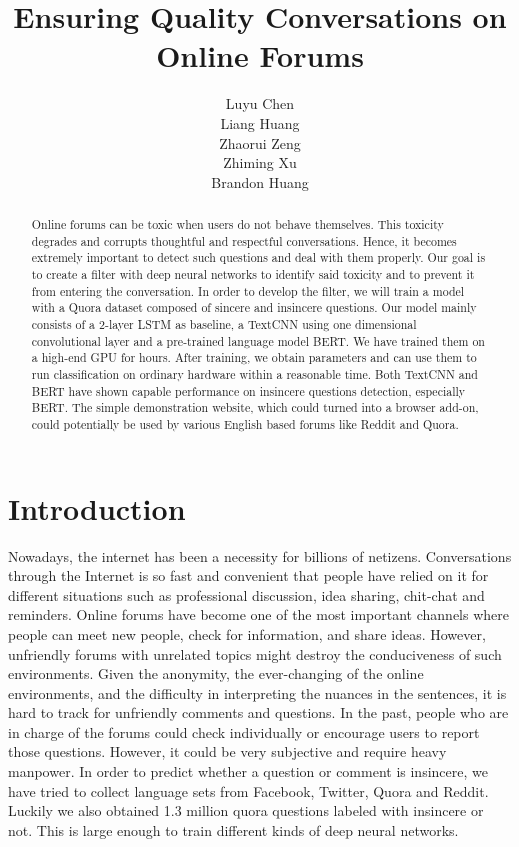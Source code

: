 \documentclass{article}
\title{Ensuring Quality Conversations on Online Forums}
\author{%
  Luyu Chen\\
  \And
  Liang Huang\\
  \And
  Zhaorui Zeng\\
  \And
  Zhiming Xu\\
  \And Brandon Huang
}
\begin{document}

\maketitle

\begin{abstract}
  Online forums can be toxic when users do not behave themselves. This toxicity degrades and corrupts thoughtful and respectful conversations. Hence, it becomes extremely important to detect such questions and deal with them properly. Our goal is to create a filter with deep neural networks to identify said toxicity and to prevent it from entering the conversation. In order to develop the filter, we will train a model with a Quora dataset composed of sincere and insincere questions. Our model mainly consists of a 2-layer LSTM as baseline, a TextCNN using one dimensional convolutional layer and a pre-trained language model BERT. We have trained them on a high-end GPU for hours. After training, we obtain parameters and can use them to run classification on ordinary hardware within a reasonable time. Both TextCNN and BERT have shown capable performance on insincere questions detection, especially BERT. The simple demonstration website, which could turned into a browser add-on, could potentially be used by various English based forums like Reddit and Quora.
\end{abstract}

\section{Introduction}
Nowadays, the internet has been a necessity for billions of netizens. Conversations through the Internet is so fast and convenient that people have relied on it for different situations such as professional discussion, idea sharing, chit-chat and reminders. Online forums have become one of the most important channels where people can meet new people, check for information, and share ideas. However, unfriendly forums with unrelated topics might destroy the conduciveness of such environments. Given the anonymity, the ever-changing of the online environments, and the difficulty in interpreting the nuances in the sentences, it is hard to track for unfriendly comments and questions. In the past, people who are in charge of the forums could check individually or encourage users to report those questions. However, it could be very subjective and require heavy manpower. In order to predict whether a question or comment is insincere, we have tried to collect language sets from Facebook, Twitter, Quora and Reddit. Luckily we also obtained 1.3 million quora questions labeled with insincere or not. This is large enough to train different kinds of deep neural networks. 
\end{document}
